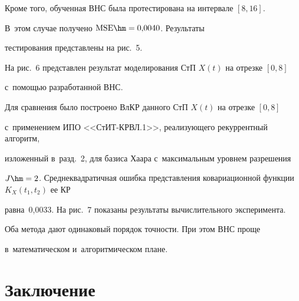   


   


  Кроме того, обученная ВНС была протестирована на интервале $[8,16]$. 


В~этом случае получено $\mathrm{MSE}\hm=0{,}0040$. Результаты 


тестирования представлены на рис.~5. 


  


  





 


  На рис.~6 представлен результат моделирования СтП $X(t)$ на отрезке $[0,8]$ 


с~по\-мощью разработанной ВНС. 


  


  








  Для сравнения было построено ВлКР данного СтП $X(t)$ на отрезке $[0,8]$ 


  с~применением ИПО <<СтИТ-КРВЛ.1>>, реализующего рекуррентный алгоритм, 


изложенный в~разд.~2, для базиса Хаара с~максимальным уровнем разрешения 


$J\hm=2$. Сред\-не\-квад\-ра\-тич\-ная ошибка пред\-став\-ле\-ния ковариационной функции $K_X(t_1,t_2)$ ее КР 


равна~0,0033. На рис.~7 показаны результаты вы\-чис\-ли\-тель\-но\-го эксперимента. 


Оба метода дают одинаковый порядок точ\-ности. При этом ВНС проще 


в~математическом и~алгоритмическом плане.


  


  








\section{Заключение}





\vspace*{-4pt}


